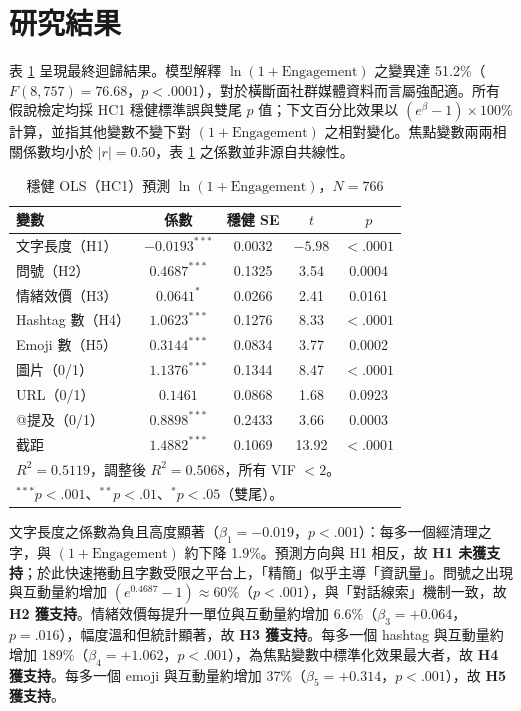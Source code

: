\documentclass[12pt,a4paper]{ctexart}
\begin{document}
\section{研究結果}

表 \ref{tab:reg} 呈現最終迴歸結果。模型解釋 $\ln(1+\text{Engagement})$ 之變異達 51.2\%（$F(8,757)=76.68$，$p<.0001$），對於橫斷面社群媒體資料而言屬強配適。所有假說檢定均採 HC1 穩健標準誤與雙尾 $p$ 值；下文百分比效果以 $(e^{\beta}-1)\times 100\%$ 計算，並指其他變數不變下對 $(1+\text{Engagement})$ 之相對變化。焦點變數兩兩相關係數均小於 $|r|=0.50$，表 \ref{tab:reg} 之係數並非源自共線性。

\begin{table}[H]
\centering\small
\caption{穩健 OLS（HC1）預測 $\ln(1+\text{Engagement})$，$N=766$}
\label{tab:reg}
\begin{tabular}{lcccc}
\toprule
變數 & 係數 & 穩健 SE & $t$ & $p$ \\
\midrule
文字長度（H1）& $-0.0193^{***}$ & 0.0032 & $-5.98$ & $<.0001$ \\
問號（H2）& $0.4687^{***}$ & 0.1325 & 3.54 & 0.0004 \\
情緒效價（H3）& $0.0641^{*}$ & 0.0266 & 2.41 & 0.0161 \\
Hashtag 數（H4）& $1.0623^{***}$ & 0.1276 & 8.33 & $<.0001$ \\
Emoji 數（H5）& $0.3144^{***}$ & 0.0834 & 3.77 & 0.0002 \\
圖片（0/1）& $1.1376^{***}$ & 0.1344 & 8.47 & $<.0001$ \\
URL（0/1）& $0.1461$ & 0.0868 & 1.68 & 0.0923 \\
@提及（0/1）& $0.8898^{***}$ & 0.2433 & 3.66 & 0.0003 \\
截距 & $1.4882^{***}$ & 0.1069 & 13.92 & $<.0001$ \\
\midrule
\multicolumn{5}{l}{$R^2 = 0.5119$，調整後 $R^2 = 0.5068$，所有 VIF $<2$。} \\
\multicolumn{5}{l}{$^{***}p<.001$、$^{**}p<.01$、$^{*}p<.05$（雙尾）。} \\
\end{tabular}
\end{table}

文字長度之係數為負且高度顯著（$\beta_1=-0.019$，$p<.001$）：每多一個經清理之字，與 $(1+\text{Engagement})$ 約下降 1.9\%。預測方向與 H1 相反，故 \textbf{H1 未獲支持}；於此快速捲動且字數受限之平台上，「精簡」似乎主導「資訊量」。問號之出現與互動量約增加 $(e^{0.4687}-1)\approx 60\%$（$p<.001$），與「對話線索」機制一致，故 \textbf{H2 獲支持}。情緒效價每提升一單位與互動量約增加 6.6\%（$\beta_3=+0.064$，$p=.016$），幅度溫和但統計顯著，故 \textbf{H3 獲支持}。每多一個 hashtag 與互動量約增加 189\%（$\beta_4=+1.062$，$p<.001$），為焦點變數中標準化效果最大者，故 \textbf{H4 獲支持}。每多一個 emoji 與互動量約增加 37\%（$\beta_5=+0.314$，$p<.001$），故 \textbf{H5 獲支持}。
\end{document}
